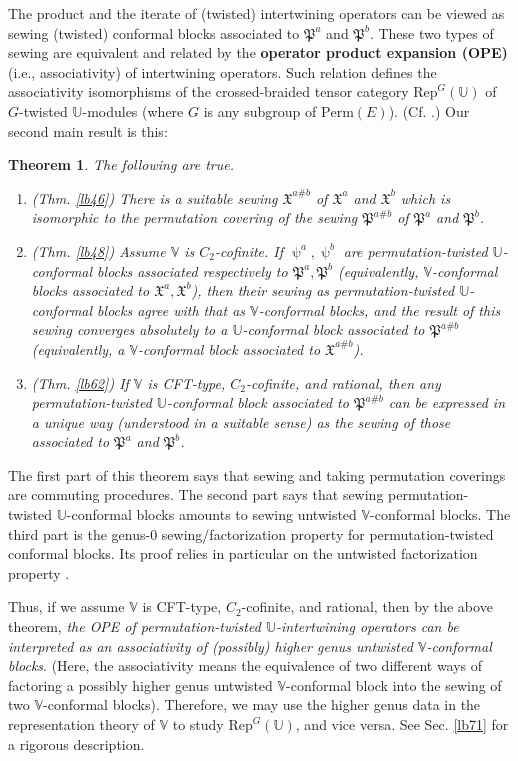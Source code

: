 \documentclass[12pt,a4paper,notitlepage]{article}
\theoremstyle{definition}
\theoremstyle{plain}
\newtheorem{Mthm}{Theorem}
\newcommand{\fk}{\mathfrak}
\newcommand{\Rep}{\mathrm{Rep}}
\newcommand{\Vbb}{\mathbb V}
\newcommand{\Ubb}{\mathbb U}
\newcommand{\Perm}{\mathrm{Perm}}
\numberwithin{equation}{subsection}
\begin{document}
The product and the iterate of (twisted) intertwining operators can be viewed as sewing (twisted) conformal blocks associated to $\fk P^a$ and $\fk P^b$. These two types of sewing are equivalent and related by the \textbf{operator product expansion (OPE)} (i.e., associativity) of intertwining operators. Such relation defines the associativity isomorphisms of the crossed-braided tensor category $\Rep^G(\Ubb)$ of $G$-twisted $\Ubb$-modules (where $G$ is any subgroup of $\Perm(E)$). (Cf. \cite{Hua95,McR21}.) Our second main result is this: 


\begin{Mthm}\label{lb70}
The following are true.
\begin{enumerate}
\item (Thm. \ref{lb46}) There is a suitable sewing $\fk X^{a\#b}$  of $\fk X^a$ and $\fk X^b$ which is isomorphic to the permutation covering of the sewing $\fk P^{a\#b}$ of $\fk P^a$ and $\fk P^b$. 
\item (Thm. \ref{lb48}) Assume $\Vbb$ is $C_2$-cofinite. If $\uppsi^a,\uppsi^b$ are permutation-twisted $\Ubb$-conformal blocks associated respectively to $\fk P^a,\fk P^b$ (equivalently, $\Vbb$-conformal blocks associated to $\fk X^a,\fk X^b$), then their sewing as permutation-twisted $\Ubb$-conformal blocks agree with that as $\Vbb$-conformal blocks, and the result of this sewing converges absolutely to a  $\Ubb$-conformal block associated to $\fk P^{a\#b}$ (equivalently, a $\Vbb$-conformal block associated to $\fk X^{a\#b}$).

\item (Thm. \ref{lb62}) If $\Vbb$ is CFT-type, $C_2$-cofinite, and rational, then any permutation-twisted $\Ubb$-conformal block associated to $\fk P^{a\#b}$ can be expressed in a unique way (understood in a suitable sense) as the sewing of those associated to $\fk P^a$ and $\fk P^b$.
\end{enumerate}
\end{Mthm}

The first part of this theorem says that sewing and taking permutation coverings are commuting procedures. The second part says that sewing  permutation-twisted $\Ubb$-conformal blocks amounts to sewing untwisted $\Vbb$-conformal blocks. The third part is the genus-$0$ sewing/factorization property for permutation-twisted conformal blocks. Its proof relies in particular on the untwisted factorization property \cite{DGT19b}.




Thus, if we assume $\Vbb$ is CFT-type, $C_2$-cofinite, and rational, then by the above theorem, \textit{the OPE of permutation-twisted $\Ubb$-intertwining operators can be interpreted as an associativity of (possibly) higher genus untwisted $\Vbb$-conformal blocks}. (Here, the associativity means the equivalence of two different ways of factoring a possibly higher genus  untwisted $\Vbb$-conformal block into the sewing of two $\Vbb$-conformal blocks).  Therefore, we may use the higher genus data in the representation theory of $\Vbb$ to study $\Rep^G(\Ubb)$, and vice versa. See Sec. \ref{lb71} for a rigorous description.
\end{document}
